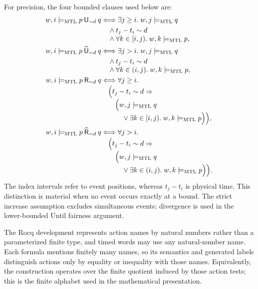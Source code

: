 \documentclass[10pt,journal,compsoc]{IEEEtran}
\newcommand{\satM}{\models_{\mathrm{MTL}}}
\newcommand{\Until}{\mathbin{\mathsf{U}}}
\newcommand{\Release}{\mathbin{\mathsf{R}}}
\newcommand{\hUntil}{\mathbin{\widehat{\mathsf{U}}}}
\newcommand{\hRelease}{\mathbin{\widehat{\mathsf{R}}}}
\begin{document}
For precision, the four bounded clauses used below are:
\begin{align*}
 w,i\satM p\Until_{\sim d}q
 &\Longleftrightarrow \exists j\ge i.\; w,j\satM q\\
 &\quad\land t_j-t_i\sim d\\[-1mm]
 &\quad\land \forall k\in[i,j).\;w,k\satM p,\\
 w,i\satM p\hUntil_{\sim d}q
 &\Longleftrightarrow \exists j>i.\; w,j\satM q\\
 &\quad\land t_j-t_i\sim d\\[-1mm]
 &\quad\land \forall k\in(i,j).\;w,k\satM p,\\
 w,i\satM p\Release_{\sim d}q
 &\Longleftrightarrow \forall j\ge i.\\[-1mm]
 &\quad\Bigl(t_j-t_i\sim d\Rightarrow\\[-1mm]
 &\qquad\Bigl(w,j\satM q\\[-1mm]
 &\qquad\quad\lor \exists k\in[i,j).\;w,k\satM p\Bigr)\Bigr),\\
 w,i\satM p\hRelease_{\sim d}q
 &\Longleftrightarrow \forall j>i.\\[-1mm]
 &\quad\Bigl(t_j-t_i\sim d\Rightarrow\\[-1mm]
 &\qquad\Bigl(w,j\satM q\\[-1mm]
 &\qquad\quad\lor \exists k\in(i,j).\;w,k\satM p\Bigr)\Bigr).
\end{align*}
The index intervals refer to event positions, whereas $t_j-t_i$ is physical
time. This distinction is material when no event occurs exactly at a bound.
The strict increase assumption excludes simultaneous events; divergence is
used in the lower-bounded Until fairness argument.

The Rocq development represents action names by natural numbers rather than a
parameterized finite type, and timed words may use any natural-number name.
Each formula mentions finitely many names, so its semantics and generated
labels distinguish actions only by equality or inequality with those names.
Equivalently, the construction operates over the finite quotient induced by
those action tests; this is the finite alphabet used in the mathematical
presentation.
\end{document}
